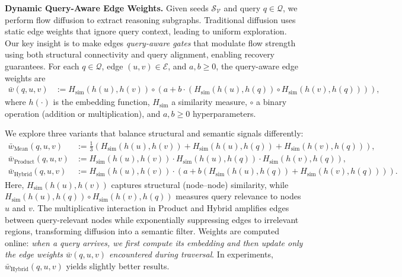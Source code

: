 \documentclass{article} %
\begin{document}
\textbf{Dynamic Query-Aware Edge Weights.} Given seeds $\mathcal{S}_{\mathcal{V}}$ and query $q \in \mathcal{Q}$, we perform flow diffusion to extract reasoning subgraphs. Traditional diffusion uses static edge weights that ignore query context, leading to uniform exploration. Our key insight is to make edges \textit{query-aware gates} that modulate flow strength using both structural connectivity and query alignment, enabling recovery guarantees. For each $q \in \mathcal{Q}$, edge $(u,v) \in \mathcal{E}$, and $a,b \geq 0$, the query-aware edge weights are
\begin{align} \label{eqn:query_weights_sim} 
\bar{w}(q, u, v) &:= H_{\text{sim}}(h(u), h(v)) \circ \left( a + b \cdot 
\left( H_{\text{sim}}(h(u), h(q)) \circ H_{\text{sim}}(h(v), h(q)) \right)\right),
\end{align}  
where $h(\cdot)$ is the embedding function, $H_{\text{sim}}$ a similarity measure, $\circ$ a binary operation (addition or multiplication), and $a,b \geq 0$ hyperparameters.  

{We explore three variants that balance structural and semantic signals differently:}
\begin{subequations}
\begin{align}
\bar{w}_{\text{Mean}}(q,u,v) &:= \tfrac{1}{3}\left( H_{\text{sim}}(h(u),h(v)) 
+ H_{\text{sim}}(h(u),h(q)) 
+ H_{\text{sim}}(h(v),h(q)) \right), \label{eqn:weight_mean} \\[0.7em]
\bar{w}_{\text{Product}}(q,u,v) &:= H_{\text{sim}}(h(u),h(v)) 
\cdot H_{\text{sim}}(h(u),h(q)) 
\cdot H_{\text{sim}}(h(v),h(q)),  \label{eqn:weight_product} \\[0.7em]
\bar{w}_{\text{Hybrid}}(q,u,v) &:= H_{\text{sim}}(h(u),h(v)) \cdot 
\left( a + b \left( H_{\text{sim}}(h(u),h(q)) + H_{\text{sim}}(h(v),h(q)) \right) \right). 
\label{eqn:weight_hybrid}
\end{align}    
\end{subequations}
Here, $H_{\text{sim}}(h(u), h(v))$ captures structural (node–node) similarity, while $H_{\text{sim}}(h(u), h(q)) \circ H_{\text{sim}}(h(v), h(q))$ measures query relevance to nodes $u$ and $v$. {The multiplicative interaction in Product and Hybrid amplifies edges between query-relevant nodes while exponentially suppressing edges to irrelevant regions, transforming diffusion into a semantic filter.} Weights are computed online: \textit{when a query arrives, we first compute its embedding and then update only the edge weights $\bar{w}(q, u, v)$ encountered during traversal}. In experiments, $\bar{w}_{\text{Hybrid}}(q,u,v)$ yields slightly better results.
\end{document}
